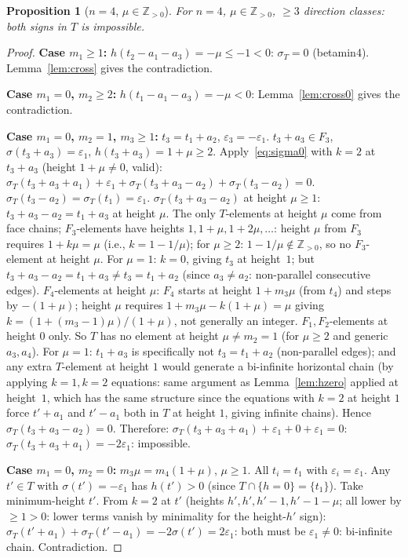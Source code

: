 \documentclass{article}
\newtheorem{prop}{Proposition}
\begin{document}
\begin{prop}[$n=4$, $\mu\in\mathbb{Z}_{>0}$]\label{prop:n4muZ}
For $n=4$, $\mu\in\mathbb{Z}_{>0}$, $\ge 3$ direction classes:
both signs in $T$ is impossible.
\end{prop}
\begin{proof}
\textbf{Case $m_1\ge 1$:}
$h(t_2-a_1-a_3)=-\mu\le-1<0$: $\sigma_T=0$ (betamin4).
Lemma~\ref{lem:cross} gives the contradiction.

\textbf{Case $m_1=0$, $m_2\ge 2$:}
$h(t_1-a_1-a_3)=-\mu<0$: Lemma~\ref{lem:cross0} gives the contradiction.

\textbf{Case $m_1=0$, $m_2=1$, $m_3\ge 1$:}
$t_3=t_1+a_2$, $\varepsilon_3=-\varepsilon_1$.
$t_3+a_3\in F_3$, $\sigma(t_3+a_3)=\varepsilon_1$, $h(t_3+a_3)=1+\mu\ge 2$.
Apply~\eqref{eq:sigma0} with $k=2$ at $t_3+a_3$ (height $1+\mu\ne 0$, valid):
$\sigma_T(t_3+a_3+a_1)+\varepsilon_1+\sigma_T(t_3+a_3-a_2)+\sigma_T(t_3-a_2)=0$.
$\sigma_T(t_3-a_2)=\sigma_T(t_1)=\varepsilon_1$.
$\sigma_T(t_3+a_3-a_2)$ at height $\mu\ge 1$:
$t_3+a_3-a_2=t_1+a_3$ at height $\mu$.
The only $T$-elements at height $\mu$ come from face chains;
$F_3$-elements have heights $1,1+\mu,1+2\mu,\dots$: height $\mu$ from $F_3$ requires $1+k\mu=\mu$
(i.e., $k=1-1/\mu$); for $\mu\ge 2$: $1-1/\mu\notin\mathbb{Z}_{>0}$, so no $F_3$-element at height $\mu$.
For $\mu=1$: $k=0$, giving $t_3$ at height~$1$; but $t_3+a_3-a_2=t_1+a_3\ne t_3=t_1+a_2$ (since $a_3\ne a_2$: non-parallel consecutive edges).
$F_4$-elements at height $\mu$: $F_4$ starts at height $1+m_3\mu$ (from $t_4$) and steps by $-(1+\mu)$;
height $\mu$ requires $1+m_3\mu-k(1+\mu)=\mu$ giving $k=(1+(m_3-1)\mu)/(1+\mu)$,
not generally an integer.  $F_1,F_2$-elements at height $0$ only.
So $T$ has no element at height $\mu\ne m_2=1$ (for $\mu\ge 2$ and generic $a_3,a_4$).
For $\mu=1$: $t_1+a_3$ is specifically not $t_3=t_1+a_2$ (non-parallel edges); and any extra $T$-element at height $1$ would generate a bi-infinite horizontal chain (by applying $k=1,k=2$ equations: same argument as Lemma~\ref{lem:hzero} applied at height~$1$, which has the same structure since the equations with $k=2$ at height $1$ force $t'+a_1$ and $t'-a_1$ both in $T$ at height $1$, giving infinite chains).
Hence $\sigma_T(t_3+a_3-a_2)=0$.
Therefore: $\sigma_T(t_3+a_3+a_1)+\varepsilon_1+0+\varepsilon_1=0$:
$\sigma_T(t_3+a_3+a_1)=-2\varepsilon_1$: impossible.

\textbf{Case $m_1=0$, $m_2=0$:}
$m_3\mu=m_4(1+\mu)$, $\mu\ge 1$.  All $t_i=t_1$ with $\varepsilon_i=\varepsilon_1$.
Any $t'\in T$ with $\sigma(t')=-\varepsilon_1$ has $h(t')>0$ (since $T\cap\{h=0\}=\{t_1\}$).
Take minimum-height $t'$.  From $k=2$ at $t'$ (heights $h',h',h'-1,h'-1-\mu$;
all lower by $\ge 1>0$: lower terms vanish by minimality for the height-$h'$ sign):
$\sigma_T(t'+a_1)+\sigma_T(t'-a_1)=-2\sigma(t')=2\varepsilon_1$:
both must be $\varepsilon_1\ne 0$: bi-infinite chain. Contradiction.
\end{proof}
\end{document}
